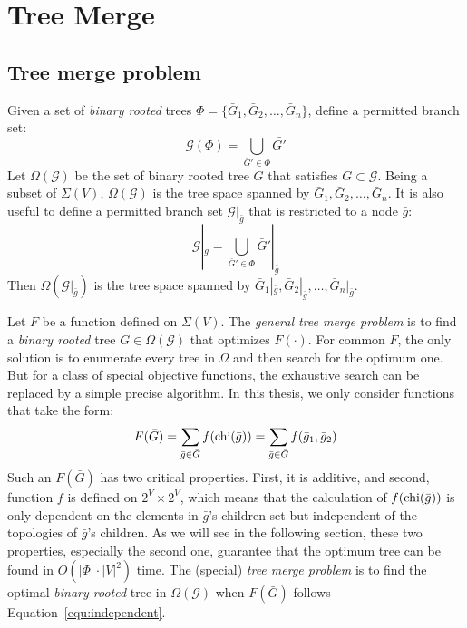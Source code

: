 \section{Tree Merge}

\subsection{Tree merge problem}

Given a set of \emph{binary rooted} trees $\Phi=\{\bar{G}_1,\bar{G}_2,\ldots,\bar{G}_n\}$, define a permitted branch set:
\begin{equation}
\mathcal{G}(\Phi)=\bigcup_{\bar{G}'\in\Phi} \bar{G'}
\end{equation}
Let $\Omega(\mathcal{G})$ be the set of binary rooted tree $\bar{G}$ that satisfies $\bar{G}\subset\mathcal{G}$.
Being a subset of $\Sigma(V)$, $\Omega(\mathcal{G})$
is the tree space spanned by $\bar{G}_1,\bar{G}_2,\ldots,\bar{G}_n$.
It is also useful to define a permitted branch set $\mathcal{G}|_{\bar{g}}$ that
is restricted to a node $\bar{g}$:
\begin{equation}
\mathcal{G}|_{\bar{g}} = \bigcup_{\bar{G}'\in\Phi} \bar{G}'|_{\bar{g}}
\end{equation}
Then $\Omega(\mathcal{G}|_{\bar{g}})$ is the tree space spanned by $\bar{G}_1|_{\bar{g}},\bar{G}_2|_{\bar{g}},\ldots,
\bar{G}_n|_{\bar{g}}$.

Let $F$ be a function defined on $\Sigma(V)$. The \emph{general tree merge problem}
 is to find a \emph{binary rooted} tree
$\bar{G}\in\Omega(\mathcal{G})$ that optimizes $F(\cdot)$. For common $F$, the only solution is to
enumerate every tree in $\Omega$ and then search for the optimum one. But for
a class of special objective functions, the exhaustive search can be replaced by a simple precise
algorithm. In this thesis, we only consider functions that take the form:
\begin{equation}\label{equ:independent}
F(\bar{G})=\sum_{\bar{g}\in \bar{G}}f(\mathrm{chi}(\bar{g}))=\sum_{\bar{g}\in \bar{G}}f(\bar{g}_1,\bar{g}_2)
\end{equation}
Such an $F(\bar{G})$ has two critical properties. First, it is additive, and second,
function $f$ is defined on $2^V\times 2^V$, which means that the calculation of $f(\mathrm{chi}(\bar{g}))$ is
only dependent on the elements in $\bar{g}$'s children set but independent of the topologies of
$\bar{g}$'s children. As we will see in the following section,
these two properties, especially the second one, guarantee that the optimum tree can be
found in $O(|\Phi|\cdot|V|^2)$ time.
The (special) \emph{tree merge problem} is to find the optimal \emph{binary rooted} tree
in $\Omega(\mathcal{G})$ when $F(\bar{G})$ follows Equation~\ref{equ:independent}.

